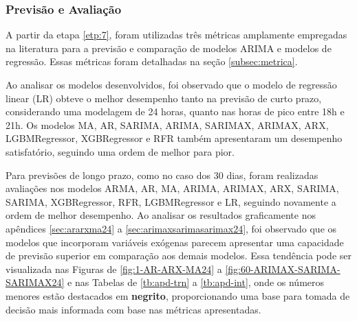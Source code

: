 \subsubsection{Previs\~ao e Avalia\c c\~ao}\label{subsubsec:modelos}

A partir da etapa \ref{etp:7}, foram utilizadas três métricas amplamente empregadas na literatura para a previsão e comparação de modelos ARIMA e modelos de regressão. Essas métricas foram detalhadas na seção \ref{subsec:metrica}.

Ao analisar os modelos desenvolvidos, foi observado que o modelo de regressão linear (LR) obteve o melhor desempenho tanto na previsão de curto prazo, considerando uma modelagem de 24 horas, quanto nas horas de pico entre 18h e 21h. Os modelos MA, AR, SARIMA, ARIMA, SARIMAX, ARIMAX, ARX, LGBMRegressor, XGBRegressor e RFR também apresentaram um desempenho satisfatório, seguindo uma ordem de melhor para pior.

Para previsões de longo prazo, como no caso dos 30 dias, foram realizadas avaliações nos modelos ARMA, AR, MA, ARIMA, ARIMAX, ARX, SARIMA, SARIMA, XGBRegressor, RFR, LGBMRegressor e LR, seguindo novamente a ordem de melhor desempenho. Ao analisar os resultados graficamente nos apêndices \ref{sec:ararxma24} a \ref{sec:arimaxsarimasarimax24}, foi observado que os modelos que incorporam variáveis exógenas parecem apresentar uma capacidade de previsão superior em comparação aos demais modelos. Essa tendência pode ser visualizada nas Figuras de \ref{fig:1-AR-ARX-MA24} a \ref{fig:60-ARIMAX-SARIMA-SARIMAX24} e nas Tabelas de \ref{tb:apd-trn} a \ref{tb:apd-int}, onde os números menores estão destacados em \textbf{negrito}, proporcionando uma base para tomada de decisão mais informada com base nas métricas apresentadas.
